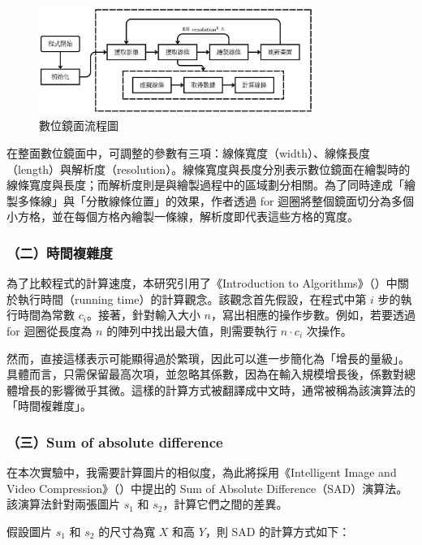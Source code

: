 \documentclass[12pt]{article}
\begin{document}
\begin{figure}[htbp]
  \centering
  \includegraphics[width=0.8\textwidth]{img//program_flaw.jpg}
  \caption{數位鏡面流程圖}\label{fig:program_flaw}
\end{figure}

在整面數位鏡面中，可調整的參數有三項：線條寬度（width）、線條長度（length）與解析度（resolution）。線條寬度與長度分別表示數位鏡面在繪製時的線條寬度與長度；而解析度則是與繪製過程中的區域劃分相關。為了同時達成「繪製多條線」與「分散線條位置」的效果，作者透過 for 迴圈將整個鏡面切分為多個小方格，並在每個方格內繪製一條線，解析度即代表這些方格的寬度。

\subsubsection{（二）時間複雜度}

為了比較程式的計算速度，本研究引用了《Introduction to Algorithms》（\cite{cormen01introduction}）中關於執行時間（running time）的計算觀念。該觀念首先假設，在程式中第 $i$ 步的執行時間為常數 $c_i$。接著，針對輸入大小 $n$，寫出相應的操作步數。例如，若要透過 for 迴圈從長度為 $n$ 的陣列中找出最大值，則需要執行 $n \cdot c_i$ 次操作。

然而，直接這樣表示可能顯得過於繁瑣，因此可以進一步簡化為「增長的量級」。具體而言，只需保留最高次項，並忽略其係數，因為在輸入規模增長後，係數對總體增長的影響微乎其微。這樣的計算方式被翻譯成中文時，通常被稱為該演算法的「時間複雜度」。

\subsubsection{（三）Sum of absolute difference}

在本次實驗中，我需要計算圖片的相似度，為此將採用《Intelligent Image and Video Compression》（\cite{BULL2021107}）中提出的 Sum of Absolute Difference（SAD）演算法。該演算法針對兩張圖片 $s_1$ 和 $s_2$，計算它們之間的差異。

假設圖片 $s_1$ 和 $s_2$ 的尺寸為寬 $X$ 和高 $Y$，則 SAD 的計算方式如下：
\end{document}
